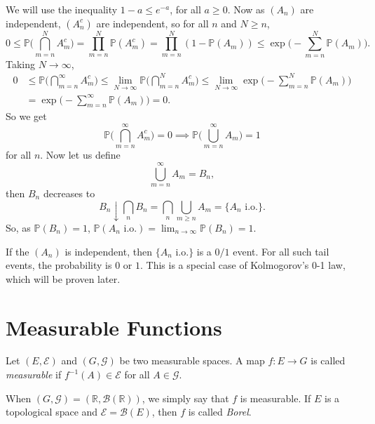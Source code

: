 \documentclass[12pt]{article}
\begin{document}
\begin{proofbox}
	We will use the inequality $1 - a \leq e^{-a}$, for all $a \geq 0$. Now as $(A_n)$ are independent, $(A_n^{c})$ are independent, so for all $n$ and $N \geq n$,
	\[
	0 \leq \mathbb{P} \Biggl( \bigcap_{m = n}^{N} A_m^{c} \Biggr) = \prod_{m = n}^{N} \mathbb{P}(A_m^{c}) = \prod_{m = n}^{N} (1 - \mathbb{P}(A_m)) \leq \exp \Biggl( - \sum_{m = n}^{N} \mathbb{P}(A_m) \Biggr).
	\]
	Taking $N \to \infty$,
	\begin{align*}
		0 &\leq \mathbb{P} \Biggl( \bigcap_{m = n}^{\infty} A_m^{c} \Biggr) \leq \lim_{N \to \infty} \mathbb{P} \Biggl( \bigcap_{m = n}^{N} A_m^{c} \Biggr) \leq \lim_{N \to \infty} \exp \Biggl( - \sum_{m = n}^{N} \mathbb{P}(A_m) \Biggr) \\
		  &= \exp \Biggl( - \sum_{m = n}^{\infty} \mathbb{P}(A_m) \Biggr) = 0.
	\end{align*}
	So we get
	\[
	\mathbb{P} \Biggl(\bigcap_{m = n}^{\infty} A_m^{c} \Biggr) = 0 \implies \mathbb{P} \Biggl(\bigcup_{m = n}^{\infty} A_m \Biggr) = 1
	\]
	for all $n$. Now let us define
	\[
	\bigcup_{m=n}^{\infty} A_m = B_n,
	\]
	then $B_n$ decreases to
	\[
		B_n \downarrow \bigcap_{n} B_n = \bigcap_n \bigcup_{m \geq n} A_m = \{A_n \text{ i.o.}\}.
	\]
	So, as $\mathbb{P}(B_n) = 1$, $\mathbb{P}(A_n \text{ i.o.}) = \lim_{n \to \infty} \mathbb{P}(B_n) = 1$.
\end{proofbox}

\begin{remark}
	If the $(A_n)$ is independent, then $\{A_n \text{ i.o.}\}$ is a $0/1$ event. For all such tail events, the probability is $0$ or $1$. This is a special case of Kolmogorov's 0-1 law, which will be proven later.
\end{remark}

\newpage

\section{Measurable Functions}
\label{sec:measurable_fns}

Let $(E, \mathcal{E})$ and $(G, \mathcal{G})$ be two measurable spaces. A map $f : E \to G$ is called \emph{measurable} if $f^{-1}(A) \in \mathcal{E}$ for all $A \in \mathcal{G}$.

When $(G, \mathcal{G}) = (\mathbb{R}, \mathcal{B}(\mathbb{R}))$, we simply say that $f$ is measurable. If $E$ is a topological space and $\mathcal{E} = \mathcal{B}(E)$, then $f$ is called \emph{Borel}.
\end{document}

